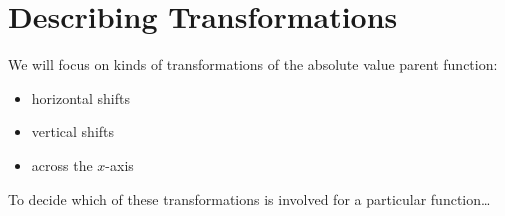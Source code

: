 \section{Describing Transformations}
We will focus on  kinds of transformations
of the absolute value parent function:
\begin{itemize}[nosep]
    \item horizontal shifts   
    \item vertical shifts   
    \item {} across the $x$-axis
\end{itemize}

\begin{myConceptSteps}{To decide which of these transformations is involved for a particular function\dots}
\end{myConceptSteps}


